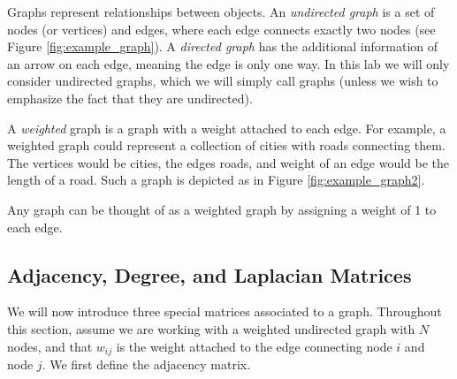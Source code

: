 %
%



Graphs represent relationships between objects.
An \emph{undirected graph} is a set of nodes (or vertices) and edges, where each edge connects exactly two nodes (see Figure \ref{fig:example_graph}).
A \emph{directed graph} has the additional information of an arrow on each edge, meaning the edge is only one way. 
In this lab we will only consider undirected graphs, which we will simply call graphs (unless we wish to emphasize the fact that they are undirected).


A \emph{weighted} graph is a graph with a weight attached to each edge.
For example, a weighted graph could represent a collection of cities with roads connecting them.
The vertices would be cities, the edges roads, and weight of an edge would be the length of a road.
Such a graph is depicted as in Figure \ref{fig:example_graph2}.

Any graph can be thought of as a weighted graph by assigning a weight of 1 to each edge.

\subsection*{Adjacency, Degree, and Laplacian Matrices}
We will now introduce three special matrices associated to a graph. 
Throughout this section, assume we are working with a weighted undirected graph with $N$ nodes, and that $w_{ij}$ is the weight attached to the edge connecting node $i$ and node $j$.
We first define the adjacency matrix.

